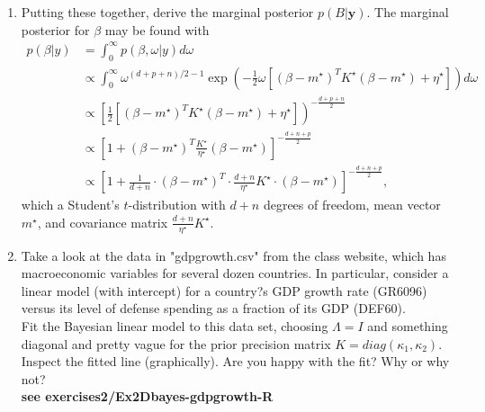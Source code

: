 \documentclass{homework}
\begin{document}
\begin{enumerate}[label=(\Alph*)]
\item Putting these together, derive the marginal posterior $p(B |  \textbf{y} )$.	
	The marginal posterior for $\beta$ may be found with 
	\begin{equation} \begin{split}
		p(\beta | y) &= \int_{0}^{\infty} p(\beta, \omega | y) d\omega \\
		&\propto \int_0^{\infty} \omega^{(d + p + n)/2 - 1} \exp \left( -\frac{1}{2} \omega \left[  (\beta - m^\star)^TK^\star(\beta - m^\star) + \eta^\star \right] \right) d\omega \\
		&\propto \left[ \frac{1}{2}  \left[  (\beta - m^\star)^TK^\star(\beta - m^\star) + \eta^\star \right] \right)^{-\frac{d+p+n}{2}} \\
		&\propto \left[ 1 + (\beta - m^\star)^T \frac{K^\star}{\eta^\star} (\beta - m^\star) \right]^{-\frac{d+n+p}{2}} \\
		&\propto \left[ 1 + \frac{1}{d+n} \cdot (\beta - m^\star)^T \cdot \frac{d+n}{\eta^\star}K^\star \cdot (\beta - m^\star) \right]^{-\frac{d+n+p}{2}},
	\end{split}\end{equation}
	which a Student's $t$-distribution with $d + n$ degrees of freedom, mean vector $m^\star$, and covariance matrix $\frac{d+n}{\eta^\star}K^\star$.


\item Take a look at the data in "gdpgrowth.csv" from the class website, which has macroeconomic variables for several dozen countries. In particular, consider a linear model (with intercept) for a country?s GDP growth rate (GR6096) versus its level of defense spending as a fraction of its GDP (DEF60). \\
Fit the Bayesian linear model to this data set, choosing $\Lambda = I$ and something diagonal and pretty vague for the prior precision matrix $K = diag(\kappa_1, \kappa_2)$. Inspect the fitted line (graphically). Are you happy with the fit? Why or why not?\\ 
\textbf{see exercises2/Ex2Dbayes-gdpgrowth-R}
\end{enumerate}
\end{document}
